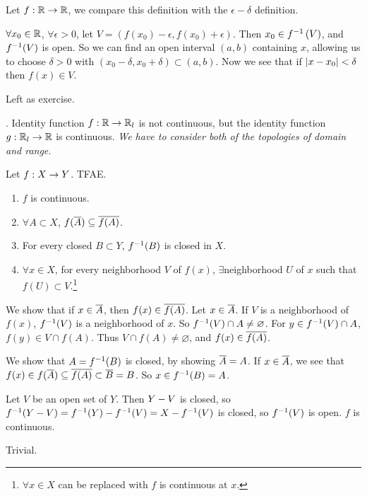 \rmk Let \(f : \mathbb{R} \rightarrow \mathbb{R}\), we compare this definition with the \(\epsilon-\delta\) definition.

\note{\mimp} \(\forall x_0 \in \mathbb{R}\), \(\forall \epsilon > 0\), let \(V = (f(x_0) - \epsilon, f(x_0) + \epsilon)\). Then \(x_0 \in f^{-1}\left( V \right)\), and \(f^{-1}(V)\) is open. So we can find an open interval \((a, b)\) containing \(x\), allowing us to choose \(\delta > 0\) with \((x_0 - \delta, x_0 + \delta) \subset (a, b)\). Now we see that if \(\left| x - x_0 \right| < \delta\) then \(f(x) \in V\).

\note{\mimpd} Left as exercise.

\ex. Identity function \(f : \mathbb{R} \rightarrow \mathbb{R}_l\) is not continuous, but the identity function \(g: \mathbb{R}_l \rightarrow \mathbb{R}\) is continuous. \textit{We have to consider both of the topologies of domain and range.}

 Let \(f : X \rightarrow Y\). TFAE.
\begin{enumerate}
    \item \(f\) is continuous.
    \item \(\forall A \subset X\), \(f(\overline{A}) \subseteq \overline{f(A)}\).
    \item For every closed \(B \subset Y\), \(f^{-1}(B)\) is closed in \(X\).
    \item \(\forall x \in X\), for every neighborhood \(V\) of \(f(x)\),   \(\exists\)neighborhood \(U\) of \(x\) such that \(f(U) \subset V\).\footnote{\(\forall x \in X\) can be replaced with \(f\) is continuous at \(x\).}
\end{enumerate}

\pf

 We show that if \(x \in \overline{A}\), then \(f(x) \in \overline{f(A)}\). Let \(x \in \overline{A}\). If \(V\) is a neighborhood of \(f(x)\), \(f^{-1}(V)\) is a neighborhood of \(x\). So \(f^{-1}(V) \cap A \neq \varnothing\). For \(y \in f^{-1}(V) \cap A\), \(f(y) \in V \cap f(A)\). Thus \(V \cap f(A) \neq \varnothing\), and \(f(x) \in \overline{f(A)}\).

 We show that \(A = f^{-1}(B)\) is closed, by showing \(\overline{A} = A\). If \(x \in \overline{A}\), we see that \(f(x) \in f(\overline{A}) \subseteq \overline{f(A)} \subset \overline{B} = B\). So \(x \in f^{-1}(B) = A\).

 Let \(V\) be an open set of \(Y\). Then \(Y - V\) is closed, so \(f^{-1}(Y - V) = f^{-1}(Y) - f^{-1}(V) = X - f^{-1}(V)\) is closed, so \(f^{-1}(V)\) is open. \(f\) is continuous.

 Trivial.

